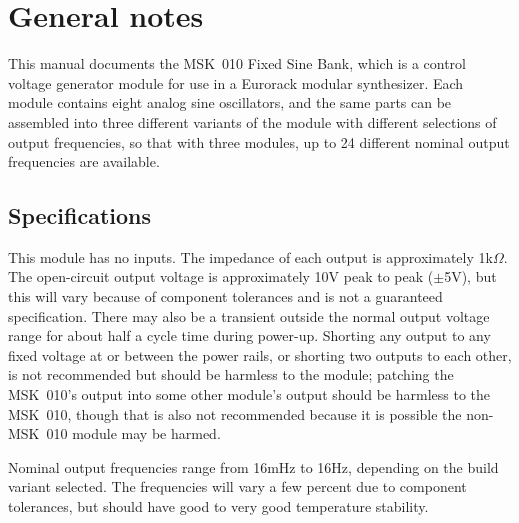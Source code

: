 
%
%
%
%
%
%

\chapter{General notes}

This manual documents the MSK~010 Fixed Sine Bank, which is a
control voltage generator module for use in a Eurorack modular synthesizer. 
Each module contains eight analog sine oscillators, and the same parts can
be assembled into three different variants of the module with different
selections of output frequencies, so that with three modules, up to 24
different nominal output frequencies are available.

\section{Specifications}

This module has no inputs.  The impedance of each output is approximately
1k$\Omega$.  The open-circuit output voltage is approximately 10V peak to
peak ($\pm$5V), but this will vary because of component tolerances and is
not a guaranteed specification.  There may also be a transient outside the
normal output voltage range for about half a cycle time during power-up. 
Shorting any output to any fixed voltage at or between the power rails, or
shorting two outputs to each other, is not recommended but should be
harmless to the module; patching the MSK~010's output into some other
module's output should be harmless to the MSK~010, though that is also not
recommended because it is possible the non-MSK~010 module may be harmed.

Nominal output frequencies range from 16mHz to 16Hz, depending on the build
variant selected.  The frequencies will vary a few percent due to component
tolerances, but should have good to very good temperature stability.

